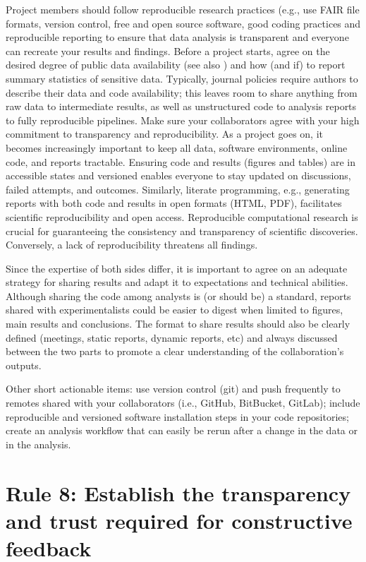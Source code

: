 \documentclass{article}
\begin{document}
Project members should follow reproducible research practices (e.g., use FAIR file formats, version control, free and open source software, good coding practices and reproducible reporting \cite{wilkinson2016fair,sandve2013ten,stawarczyk2023establishing} to ensure that data analysis is transparent and everyone can recreate your results and findings. Before a project starts, agree on the desired degree of public data availability (see also ) and how (and if) to report summary statistics of sensitive data. Typically, journal policies require authors to describe their data and code availability; this leaves room to share anything from raw data to intermediate results, as well as unstructured code to analysis reports to fully reproducible pipelines. Make sure your collaborators agree with your high commitment to transparency and reproducibility. As a project goes on, it becomes increasingly important to keep all data, software environments, online code, and reports tractable. Ensuring code and results (figures and tables) are in accessible states and versioned enables everyone to stay updated on discussions, failed attempts, and outcomes. Similarly, literate programming\cite{knuth1984literate}, e.g., generating reports with both code and results in open formats (HTML, PDF), facilitates scientific reproducibility and open access. Reproducible computational research is crucial for guaranteeing the consistency and transparency of scientific discoveries. Conversely, a lack of reproducibility threatens all findings.

Since the expertise of both sides differ, it is important to agree on an adequate strategy for sharing results and adapt it to expectations and technical abilities. Although sharing the code among analysts is (or should be) a standard, reports shared with experimentalists could be easier to digest when limited to figures, main results and conclusions. The format to share results should also be clearly defined (meetings, static reports, dynamic reports, etc) and always discussed between the two parts to promote a clear understanding of the collaboration's outputs.   

Other short actionable items: use version control (git) and push frequently to remotes shared with your collaborators (i.e., GitHub, BitBucket, GitLab); include reproducible and versioned software installation steps in your code repositories; create an analysis workflow that can easily be rerun after a change in the data or in the analysis.

\section*{Rule 8: Establish the transparency and trust required for constructive feedback} %
\label{rule8_trust}
\end{document}
